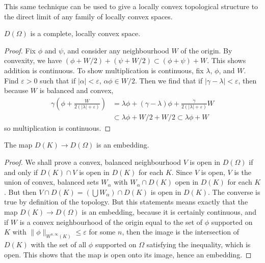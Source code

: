 \begin{remark}
    This same technique can be used to give a locally convex topological structure to the direct limit of any family of locally convex spaces.
\end{remark}

\begin{theorem}
    $D(\Omega)$ is a complete, locally convex space.
\end{theorem}
\begin{proof}
    Fix $\phi$ and $\psi$, and consider any neighbourhood $W$ of the origin. By convexity, we have $(\phi + W/2) + (\psi + W/2) \subset (\phi + \psi) + W$. This shows addition is continuous. To show multiplication is continuous, fix $\lambda$, $\phi$, and $W$. Find $\varepsilon > 0$ such that if $|\alpha| < \varepsilon$, $\alpha \phi \in W/2$. Then we find that if $|\gamma - \lambda| < \varepsilon$, then because $W$ is balanced and convex,
    \begin{align*}
        \gamma \left(\phi + \frac{W}{2(|\lambda| + \varepsilon)} \right) &= \lambda \phi + (\gamma - \lambda) \phi + \frac{\gamma}{2(|\lambda| + \varepsilon)} W\\
        &\subset \lambda \phi + W/2 + W/2 \subset \lambda \phi + W
    \end{align*}
    so multiplication is continuous.
\end{proof}

\begin{theorem}
    The map $D(K) \to D(\Omega)$ is an embedding.
\end{theorem}
\begin{proof}
    We shall prove a convex, balanced neighbourhood $V$ is open in $D(\Omega)$ if and only if $D(K) \cap V$ is open in $D(K)$ for each $K$. Since $V$ is open, $V$ is the union of convex, balanced sets $W_\alpha$ with $W_\alpha \cap D(K)$ open in $D(K)$ for each $K$. But then $V \cap D(K) = (\bigcup W_\alpha) \cap D(K)$ is open in $D(K)$. The converse is true by definition of the topology. But this statements means exactly that the map $D(K) \to D(\Omega)$ is an embedding, because it is certainly continuous, and if $W$ is a convex neighbourhood of the origin equal to the set of $\phi$ supported on $K$ with $\| \phi \|_{W^{n,\infty}(K)} \leq \varepsilon$ for some $n$, then the image is the intersection of $D(K)$ with the set of all $\phi$ supported on $\Omega$ satisfying the inequality, which is open. This shows that the map is open onto its image, hence an embedding.
\end{proof}

